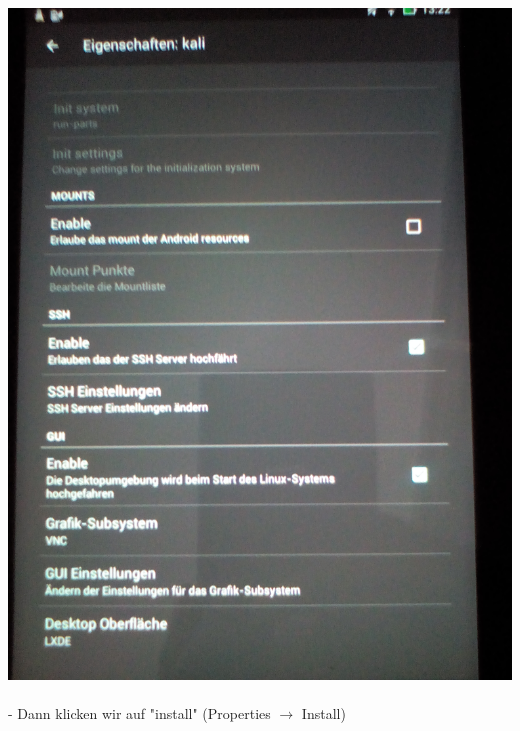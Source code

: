 \documentclass[11pt,a4paper]{article}
\begin{document}
\includegraphics[scale=0.09]{./Image/img4} \\ \\
- Dann klicken wir auf "install" (Properties $\rightarrow$ Install) \\
\end{document}
